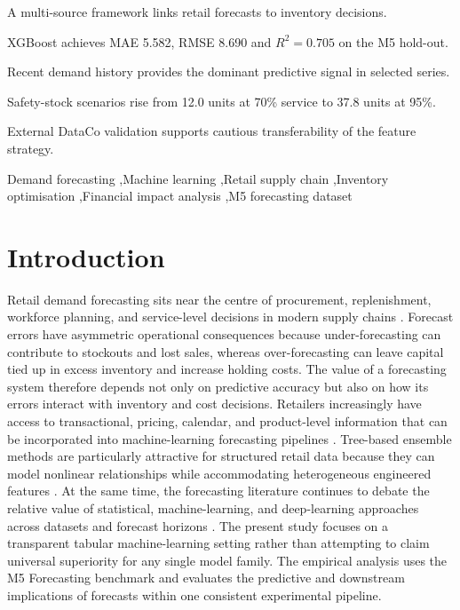 \begin{frontmatter}
\begin{highlights}
\item A multi-source framework links retail forecasts to inventory decisions.
\item XGBoost achieves MAE 5.582, RMSE 8.690 and $R^2=0.705$ on the M5 hold-out.
\item Recent demand history provides the dominant predictive signal in selected series.
\item Safety-stock scenarios rise from 12.0 units at 70\% service to 37.8 units at 95\%.
\item External DataCo validation supports cautious transferability of the feature strategy.
\end{highlights}

\begin{keyword}
Demand forecasting
\sep Machine learning
\sep Retail supply chain
\sep Inventory optimisation
\sep Financial impact analysis
\sep M5 forecasting dataset
\end{keyword}

\end{frontmatter}


\section{Introduction}

Retail demand forecasting sits near the centre of procurement, replenishment, workforce planning, and service-level decisions in modern supply chains \cite{Fildes2022RetailForecasting,Petropoulos2022ForecastingTheory}.
Forecast errors have asymmetric operational consequences because under-forecasting can contribute to stockouts and lost sales, whereas over-forecasting can leave capital tied up in excess inventory and increase holding costs.
The value of a forecasting system therefore depends not only on predictive accuracy but also on how its errors interact with inventory and cost decisions.
Retailers increasingly have access to transactional, pricing, calendar, and product-level information that can be incorporated into machine-learning forecasting pipelines \cite{Nguyen2025SupplyChainML,Makridakis2022M5}.
Tree-based ensemble methods are particularly attractive for structured retail data because they can model nonlinear relationships while accommodating heterogeneous engineered features \cite{Hu2025AutoMLRetail,Samal2025Ensemble}.
At the same time, the forecasting literature continues to debate the relative value of statistical, machine-learning, and deep-learning approaches across datasets and forecast horizons \cite{Makridakis2018M4,Lim2021TFT,Petropoulos2025Occam}.
The present study focuses on a transparent tabular machine-learning setting rather than attempting to claim universal superiority for any single model family.
The empirical analysis uses the M5 Forecasting benchmark and evaluates the predictive and downstream implications of forecasts within one consistent experimental pipeline.

